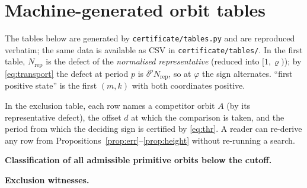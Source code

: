 \documentclass[11pt]{article}
\theoremstyle{definition}
\theoremstyle{remark}
\newcommand{\pr}{\varrho}
\begin{document}
\appendix
\section{Machine-generated orbit tables}\label{app:tables}

The tables below are generated by \texttt{certificate/tables.py} and are reproduced verbatim;
the same data is available as CSV in \texttt{certificate/tables/}. In the first table,
$N_{\mathrm{rep}}$ is the defect of the \emph{normalised representative} (reduced into
$[1,\pr)$); by \eqref{eq:transport} the defect at period $p$ is $\delta^pN_{\mathrm{rep}}$, so
at $\varphi$ the sign alternates. ``first positive state'' is the first $(m,k)$ with both
coordinates positive.

In the exclusion table, each row names a competitor orbit $A$ (by its representative defect),
the offset $d$ at which the comparison is taken, and the period from which the deciding sign is
certified by \eqref{eq:thr}. A reader can re-derive any row from
Propositions~\ref{prop:err}--\ref{prop:height} without re-running a search.

\bigskip
\noindent\textbf{Classification of all admissible primitive orbits below the cutoff.}
{\small}

\bigskip
\noindent\textbf{Exclusion witnesses.}
{\small}
\end{document}
